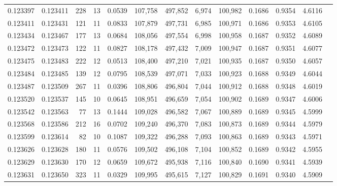 \begin{tabular}{rrrrrrrrrrrrr}
0.123397 & 0.123411 &   228 &  13 &                                     0.0539 & 107,758 & 497,852 &   6,974 & 100,982 & 0.1686 & 0.9354 & 4.6116 \\
0.123411 & 0.123431 &   121 &  11 &                                     0.0833 & 107,879 & 497,731 &   6,985 & 100,971 & 0.1686 & 0.9353 & 4.6105 \\
0.123434 & 0.123467 &   177 &  13 &                                     0.0684 & 108,056 & 497,554 &   6,998 & 100,958 & 0.1687 & 0.9352 & 4.6089 \\
0.123472 & 0.123473 &   122 &  11 &                                     0.0827 & 108,178 & 497,432 &   7,009 & 100,947 & 0.1687 & 0.9351 & 4.6077 \\
0.123475 & 0.123483 &   222 &  12 &                                     0.0513 & 108,400 & 497,210 &   7,021 & 100,935 & 0.1687 & 0.9350 & 4.6057 \\
0.123484 & 0.123485 &   139 &  12 &                                     0.0795 & 108,539 & 497,071 &   7,033 & 100,923 & 0.1688 & 0.9349 & 4.6044 \\
0.123487 & 0.123509 &   267 &  11 &                                     0.0396 & 108,806 & 496,804 &   7,044 & 100,912 & 0.1688 & 0.9348 & 4.6019 \\
0.123520 & 0.123537 &   145 &  10 &                                     0.0645 & 108,951 & 496,659 &   7,054 & 100,902 & 0.1689 & 0.9347 & 4.6006 \\
0.123542 & 0.123563 &    77 &  13 &                                     0.1444 & 109,028 & 496,582 &   7,067 & 100,889 & 0.1689 & 0.9345 & 4.5999 \\
0.123568 & 0.123586 &   212 &  16 &                                     0.0702 & 109,240 & 496,370 &   7,083 & 100,873 & 0.1689 & 0.9344 & 4.5979 \\
0.123599 & 0.123614 &    82 &  10 &                                     0.1087 & 109,322 & 496,288 &   7,093 & 100,863 & 0.1689 & 0.9343 & 4.5971 \\
0.123626 & 0.123628 &   180 &  11 &                                     0.0576 & 109,502 & 496,108 &   7,104 & 100,852 & 0.1689 & 0.9342 & 4.5955 \\
0.123629 & 0.123630 &   170 &  12 &                                     0.0659 & 109,672 & 495,938 &   7,116 & 100,840 & 0.1690 & 0.9341 & 4.5939 \\
0.123631 & 0.123650 &   323 &  11 &                                     0.0329 & 109,995 & 495,615 &   7,127 & 100,829 & 0.1691 & 0.9340 & 4.5909 \\

\end{tabular}
